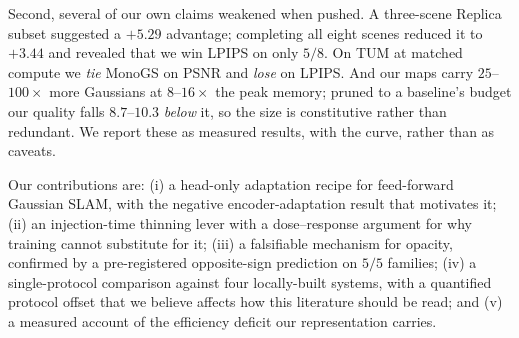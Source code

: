 Second, several of our own claims weakened when pushed. A three-scene Replica
subset suggested a $+5.29$\dB{} advantage; completing all eight scenes reduced
it to $+3.44$\dB{} and revealed that we win LPIPS on only $5/8$. On TUM at
matched compute we \emph{tie} MonoGS on PSNR and \emph{lose} on LPIPS. And our
maps carry $25$--$100\times$ more Gaussians at $8$--$16\times$ the peak memory;
pruned to a baseline's budget our quality falls $8.7$--$10.3$\dB{}
\emph{below} it, so the size is constitutive rather than redundant. We report
these as measured results, with the curve, rather than as caveats.

Our contributions are: (i) a head-only adaptation recipe for feed-forward
Gaussian SLAM, with the negative encoder-adaptation result that motivates it;
(ii) an injection-time thinning lever with a dose--response argument for why
training cannot substitute for it; (iii) a falsifiable mechanism for opacity,
confirmed by a pre-registered opposite-sign prediction on $5/5$ families;
(iv) a single-protocol comparison against four locally-built systems, with a
quantified protocol offset that we believe affects how this literature should
be read; and (v) a measured account of the efficiency deficit our
representation carries.
